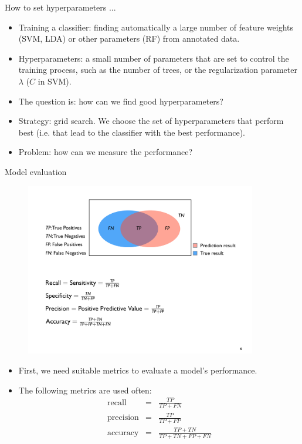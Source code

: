 \documentclass[xcolor=pdftex,dvipsnames,table]{beamer}
\begin{document}
\begin{frame}{How to set hyperparameters ... }
	\begin{itemize}
		\item Training a classifier: finding automatically a large number of feature weights (SVM, LDA) or other parameters (RF) from annotated data.
		\item Hyperparameters: a small number of parameters that are set to control the training process, such as the number of trees, or the regularization parameter $\lambda$ ($C$ in SVM).
		\item The question is: how can we find good hyperparameters?
		\item Strategy: grid search. We choose the set of hyperparameters that perform best (i.e. that lead to the classifier with the best performance).
		\item Problem: how can we measure the performance?
	\end{itemize}
\end{frame}

\begin{frame}{Model evaluation}
	\begin{figure}[htb]
		\includegraphics[width=0.9\textwidth]{../graphics/ModelEvaluation.pdf}
	\end{figure}
	\begin{itemize}
		\item First, we need suitable metrics to evaluate a model's performance.
		\item The following metrics are used often:
		\begin{eqnarray*}
		\text{recall} &=& \frac{TP}{TP + FN} \\
		\text{precision} &=& \frac{TP}{TP + FP} \\
		\text{accuracy} &=& \frac{TP + TN}{TP + TN + FP + FN} \\
		\end{eqnarray*}
	\end{itemize}
\end{frame}
\end{document}

